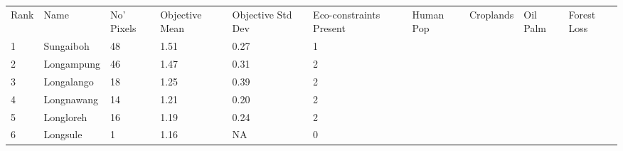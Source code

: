 \begin{table}[ht]
\centering
\begingroup\fontsize{9pt}{10pt}\selectfont
\begin{tabular}{C{0.05\textwidth}C{0.15\textwidth}C{0.08\textwidth}C{0.08\textwidth}C{0.08\textwidth}C{0.08\textwidth}C{0.08\textwidth}C{0.08\textwidth}C{0.08\textwidth}C{0.08\textwidth}}
 Rank & Name & No' Pixels & Objective Mean & Objective Std Dev & Eco-constraints  Present & Human Pop & Croplands & Oil Palm & Forest Loss \\ 
 {1} & Sungaiboh &  48 & \textcolor[HTML]{FFFFFF}{1.51} & \textcolor[HTML]{000000}{0.27} & \textcolor[HTML]{000000}{1} &  &  &  &  \\ 
  {2} & Longampung &  46 & \textcolor[HTML]{FFFFFF}{1.47} & \textcolor[HTML]{000000}{0.31} & \textcolor[HTML]{000000}{2} &  &  &  &  \\ 
  {3} & Longalango &  18 & \textcolor[HTML]{000000}{1.25} & \textcolor[HTML]{FFFFFF}{0.39} & \textcolor[HTML]{000000}{2} &  &  &  &  \\ 
  {4} & Longnawang &  14 & \textcolor[HTML]{000000}{1.21} & \textcolor[HTML]{000000}{0.20} & \textcolor[HTML]{000000}{2} &  &  &  &  \\ 
  {5} & Longloreh &  16 & \textcolor[HTML]{000000}{1.19} & \textcolor[HTML]{000000}{0.24} & \textcolor[HTML]{000000}{2} &  &  &  &  \\ 
  {6} & Longsule &   1 & \textcolor[HTML]{000000}{1.16} & \textcolor[HTML]{000000}{  NA} & \textcolor[HTML]{000000}{0} &  &  &  &  \\ 

\end{tabular}
\end{table}
